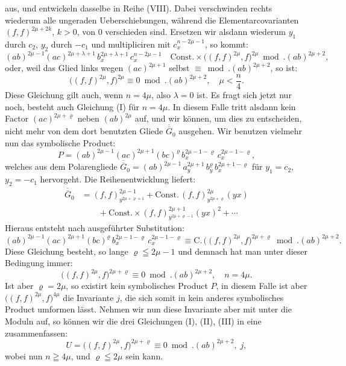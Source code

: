 \documentclass[11pt]{article}
\providecommand{\weberpage}[1]{}
\providecommand{\weq}[2]{\begin{equation}\tag{#1}#2\end{equation}}
\begin{document}
\weberpage{107}
aus, und entwickeln dasselbe in Reihe (VIII). Dabei verschwinden
rechts wiederum alle ungeraden Ueberschiebungen, während die Elementarcovarianten
$(f,f)^{2\mu+2k}$, $k > 0$, von 0 verschieden sind.
Ersetzen wir alsdann wiederum $y_1$ durch $c_2$, $y_2$ durch $-c_1$ und multipliciren
mit $c_x^{n-2\mu-1}$, so kommt:
\[
(ab)^{2\mu-1}(ac)^{2\mu+\lambda+1}\,b_x^{2\mu+\lambda+1}\,c_x^{n-2\mu-1}
\quad \text{Const.}\times \big((f,f)^{2\mu}, f\big)^{2\mu} \bmod. (ab)^{2\mu+2}, %
\]
oder, weil das Glied links wegen $(ac)^{2\mu+1}$ selbst $\equiv \bmod. (ab)^{2\mu+2}$, so ist:
\weq{II}{\big((f,f)^{2\mu}, f\big)^{2\mu} \equiv 0 \bmod. (ab)^{2\mu+2}, \quad \mu < \dfrac{n}{4}.}
Diese Gleichung gilt auch, wenn $n = 4\mu$, also $\lambda = 0$ ist. Es
fragt sich jetzt nur noch, besteht auch Gleichung (I) für $n = 4\mu$.
In diesem Falle tritt alsdann kein Factor $(ac)^{2\mu+\varrho}$ neben $(ab)^{2\mu}$ auf,
und wir können, um dies zu entscheiden, nicht mehr von dem dort
benutzten Gliede $\overline{\overline{G}}_0$ ausgehen. Wir benutzen vielmehr nun das symbolische
Product:
\[
P = (ab)^{2\mu-1}(ac)^{2\mu+1}(bc)^\varrho\,b_x^{2\mu-1-\varrho}\,c_x^{2\mu-1-\varrho},
\]
welches aus dem Polarengliede $\overline{\overline{G}}_0 = (ab)^{2\mu-1}\,a_y^{2\mu+1}\,b_y^\varrho\,b_x^{2\mu+1-\varrho}$ für $y_1 = c_2$,
$y_2 = -c_1$ hervorgeht. Die Reihenentwicklung liefert:
\[
\begin{aligned}
\overline{\overline{G}}_0 &= (f,f)^{2\mu-1}_{y^{2\mu+\varrho+1}} + \text{Const.}\,(f,f)^{2\mu}_{y^{2\mu+\varrho}}(yx) \\
&\qquad + \text{Const.}\times (f,f)^{2\mu+1}_{y^{2\mu+\varrho-1}}(yx)^2 + \cdots
\end{aligned}
\]
Hieraus entsteht nach ausgeführter Substitution:
\[
(ab)^{2\mu-1}(ac)^{2\mu+1}(bc)^\varrho\,b_x^{2\mu-1-\varrho}\,c_x^{2\mu-1-\varrho}
\equiv \text{C.}\,\big((f,f)^{2\mu}, f\big)^{2\mu+\varrho} \bmod. (ab)^{2\mu+2}.
\]
Diese Gleichung besteht, so lange $\varrho \leqq 2\mu - 1$ und demnach hat
man unter dieser Bedingung immer:
\weq{III}{\big((f,f)^{2\mu}, f\big)^{2\mu+\varrho} \equiv 0 \bmod. (ab)^{2\mu+2}, \quad n = 4\mu.}
Ist aber $\varrho = 2\mu$, so existirt kein symbolisches Product $P$, in
diesem Falle ist aber $\big((f,f)^{2\mu}, f\big)^{4\mu}$ die Invariante $j$, die sich somit
in kein anderes symbolisches Product umformen lässt. Nehmen wir
nun diese Invariante aber mit unter die Moduln auf, so können wir
die drei Gleichungen (I), (II), (III) in eine zusammenfassen:
\weq{IV}{U = \big((f,f)^{2\mu}, f\big)^{2\mu+\varrho} \equiv 0 \bmod. (ab)^{2\mu+2}, \; j,}
wobei nun $n \geqq 4\mu$, und $\varrho \leqq 2\mu$ sein kann.
\end{document}
